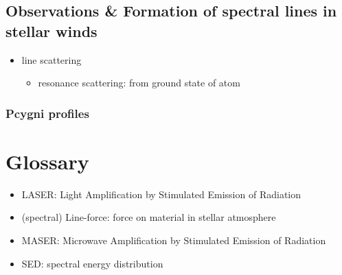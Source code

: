 \documentclass[../main/main.tex]{subfiles}
\begin{document}
\subsection{Observations \& Formation of spectral lines in stellar winds}
\begin{itemize}
\item line scattering
\begin{itemize}
\item resonance scattering: from ground state of atom
\end{itemize}
\end{itemize}

\subsubsection{Pcygni profiles}


\newpage
\section{Glossary}
\begin{itemize}
\item LASER: 
	\hfill Light Amplification by Stimulated Emission of Radiation

\item (spectral) Line-force: 
	\hfill force on material in stellar atmosphere

\item MASER: 
	\hfill Microwave Amplification by Stimulated Emission of Radiation


\item SED: 
	\hfill spectral energy distribution
\end{itemize}
\end{document}
